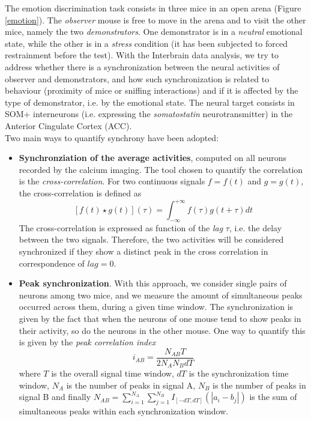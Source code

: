 \documentclass[11pt,a4paper,twocolumn]{article}
\begin{document}
The emotion discrimination task consists in three mice in an open arena (Figure \ref{emotion}). The \textit{observer} mouse is free to move in the arena and to visit the other mice, namely the two \textit{demonstrators}. One demonstrator is in a \textit{neutral} emotional state, while the other is in a \textit{stress} condition (it has been subjected to forced restrainment before the test). With the Interbrain data analysis, we try to address whether there is a synchronization between the neural activities of  observer and demonstrators, and how such synchronization is related to behaviour (proximity of mice or sniffing interactions) and if it is affected by the type of demonstrator, i.e. by the emotional state. The neural target consists in SOM+ interneurons (i.e. expressing the \textit{somatostatin} neurotransmitter) in the Anterior Cingulate Cortex (ACC).\\
Two main ways to quantify synchrony have been adopted:
\begin{itemize}
	\item \textbf{Synchronziation of the average activities}, computed on all neurons recorded by the calcium imaging. The tool chosen to quantify the correlation is the \textit{cross-correlation}. For two continuous signals $f = f(t)$ and $g = g(t)$, the cross-correlation is defined as
	$$
	[f(t) \star g(t)] (\tau) = \int_{-\infty}^{+\infty} f(\tau)g(t+\tau) dt \label{cc_def}
	$$
	The cross-correlation is expressed as function of the \textit{lag} $\tau$, i.e. the delay between the two signals. Therefore, the two activities will be considered synchronized if they show a distinct peak in the cross correlation in correspondence of $lag=0$.
	
	\item \textbf{Peak synchronization}. With this approach, we consider single pairs of neurons among two mice, and we measure the amount of simultaneous peaks occurred across them, during a given time window. The synchronization is given by the fact that when the neurons of one mouse tend to show peaks in their activity, so do the neurons in the other mouse. One way to quantify this is given by the \textit{peak correlation index}
	$$i_{AB} = \frac{N_{AB} T}{2 N_A N_B dT} \label{peak index}$$
	where $T $ is the overall signal time window, $dT$ is the synchronization time window, $N_A$ is the number of peaks in signal A, $N_B $ is the number of peaks in signal B and finally $N_{AB} = \sum_{i=1}^{N_A} \sum_{j=1}^{N_B} I_{[-dT,dT]}(|a_i - b_j|) $ is the sum of simultaneous peaks within each synchronization window.
\end{itemize}
\end{document}

